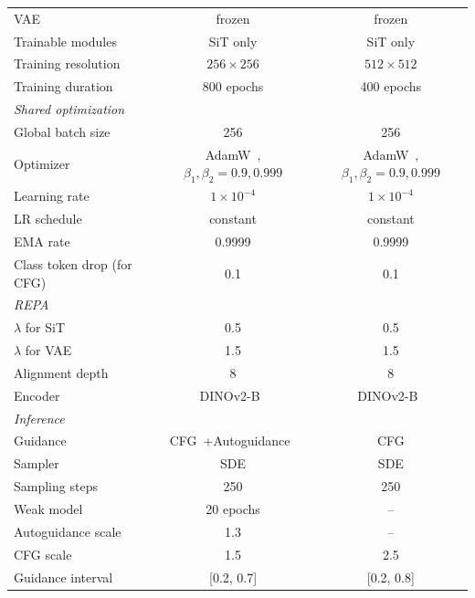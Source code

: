 \begin{table}[t]
\begin{tabular}{lcc}
VAE
& frozen
& frozen \\

Trainable modules
& SiT only
& SiT only \\

Training resolution
& $256\times256$
& $512\times512$ \\

Training duration
& 800 epochs
& 400 epochs \\

\midrule
\multicolumn{3}{l}{\textit{Shared optimization}} \\
\midrule

Global batch size
& 256
& 256 \\

Optimizer
& AdamW~\cite{adamw}, $\beta_1,\beta_2=0.9,0.999$
& AdamW~\cite{adamw}, $\beta_1,\beta_2=0.9,0.999$ \\

Learning rate
& $1\times10^{-4}$
& $1\times10^{-4}$ \\

LR schedule
& constant
& constant \\

EMA rate & 0.9999 & 0.9999 \\

Class token drop (for CFG) & 0.1 & 0.1 \\

\midrule
\multicolumn{3}{l}{\textit{REPA}} \\
\midrule
$\lambda$ for SiT & 0.5 & 0.5 \\
$\lambda$ for VAE & 1.5 & 1.5 \\
Alignment depth & 8 & 8 \\
Encoder & DINOv2-B~\cite{dino} & DINOv2-B~\cite{dino} \\
\midrule
\multicolumn{3}{l}{\textit{Inference}} \\
\midrule
Guidance 
& CFG~\cite{cfg}+Autoguidance~\cite{karras2024guiding}
& CFG \\

Sampler
& SDE
& SDE \\

Sampling steps 
& 250
& 250 \\

Weak model 
& 20 epochs
& -- \\

Autoguidance scale 
& 1.3 
& -- \\

CFG scale
& 1.5
& 2.5 \\

Guidance interval 
& [0.2, 0.7]
& [0.2, 0.8]\\

\bottomrule
\end{tabular}
\end{table}



